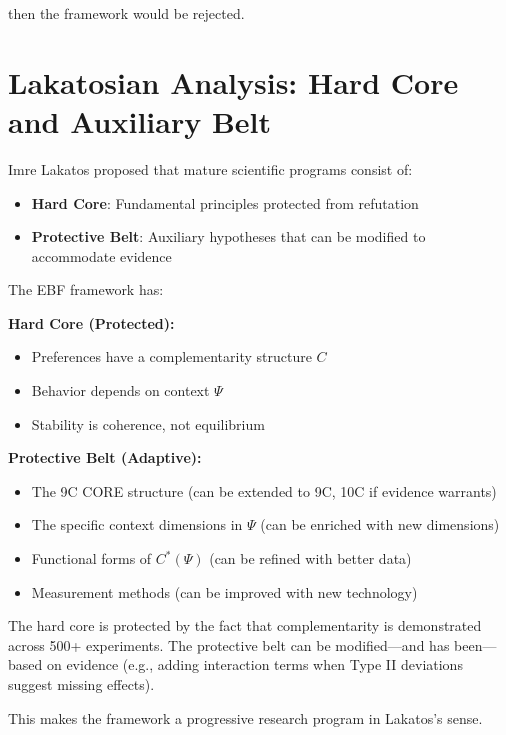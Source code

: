 \documentclass[12pt,oneside]{book}
\begin{document}
then the framework would be rejected.

\section{Lakatosian Analysis: Hard Core and Auxiliary Belt}

Imre Lakatos proposed that mature scientific programs consist of:

\begin{itemize}
  \item \textbf{Hard Core}: Fundamental principles protected from refutation
  \item \textbf{Protective Belt}: Auxiliary hypotheses that can be modified to accommodate evidence
\end{itemize}

The EBF framework has:

\begin{tcolorbox}[colback=green!5!white, colframe=green!75!black, title=Hard Core vs. Protective Belt]

\textbf{Hard Core (Protected):}
\begin{itemize}
  \item Preferences have a complementarity structure $C$
  \item Behavior depends on context $\Psi$
  \item Stability is coherence, not equilibrium
\end{itemize}

\textbf{Protective Belt (Adaptive):}
\begin{itemize}
  \item The 9C CORE structure (can be extended to 9C, 10C if evidence warrants)
  \item The specific context dimensions in $\Psi$ (can be enriched with new dimensions)
  \item Functional forms of $C^*(\Psi)$ (can be refined with better data)
  \item Measurement methods (can be improved with new technology)
\end{itemize}

\end{tcolorbox}

The hard core is protected by the fact that complementarity is demonstrated across 500+ experiments.
The protective belt can be modified—and has been—based on evidence (e.g., adding interaction terms
when Type II deviations suggest missing effects).

This makes the framework a progressive research program in Lakatos's sense.
\end{document}
